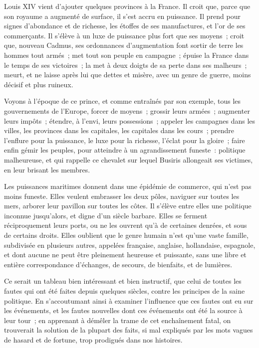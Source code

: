 \documentclass[french,twoside]{book} %
\begin{document}
Louis XIV vient d’ajouter quelques provinces à la France. Il croit que, parce que son royaume a augmenté de surface, il s’est accru en puissance. Il prend pour signes d’abondance et de richesse, les étoffes de ses manufactures, et l’or de ses commerçants. Il s’élève à un luxe de puissance plus fort que ses moyens ; croit que, nouveau Cadmus, ses ordonnances d’augmentation font sortir de terre les hommes tout armés ; met tout son peuple en campagne ; épuise la France dans le temps de ses victoires ; la met à deux doigts de sa perte dans ses malheurs ; meurt, et ne laisse après lui que dettes et misère, avec un genre de guerre, moins décisif et plus ruineux.\par
Voyons à l’époque de ce prince, et comme entraînés par son exemple, tous les gouvernements de l’Europe, forcer de moyens ; grossir leurs armées ; augmenter leurs impôts ; étendre, à l’envi, leurs possessions ; appeler les campagnes dans les villes, les provinces dans les capitales, les capitales dans les cours ; prendre l’enflure pour la puissance, le luxe pour la richesse, l’éclat pour la gloire ; faire enfin gémir les peuples, pour atteindre à un agrandissement funeste : politique malheureuse, et qui rappelle ce chevalet sur lequel Busiris allongeait ses victimes, en leur brisant les membres.\par
Les puissances maritimes donnent dans une épidémie de commerce, qui n’est pas moins funeste. Elles veulent embrasser les deux pôles, naviguer sur toutes les mers, arborer leur pavillon sur toutes les côtes. Il s’élève entre elles une politique inconnue jusqu’alors, et digne d’un siècle barbare. Elles se ferment réciproquement leurs ports, ou ne les ouvrent qu’à de certaines denrées, et sous de certains droits. Elles oublient que le genre humain n’est qu’une vaste famille, subdivisée en plusieurs autres, appelées française, anglaise, hollandaise, espagnole, et dont aucune ne peut être pleinement heureuse et puissante, sans une libre et entière correspondance d’échanges, de secours, de bienfaits, et de lumières.\par
Ce serait un tableau bien intéressant et bien instructif, que celui de toutes les fautes qui ont été faites depuis quelques siècles, contre les principes de la saine politique. En s’accoutumant ainsi à examiner l’influence que ces fautes ont eu sur les événements, et les fautes nouvelles dont ces événements ont été la source à leur tour ; en apprenant à démêler la trame de cet enchaînement fatal, on trouverait la solution de la plupart des faits, si mal expliqués par les mots vagues de hasard et de fortune, trop prodigués dans nos histoires.\par
\end{document}
